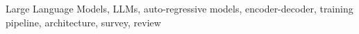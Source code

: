 Large Language Models, LLMs, auto-regressive models, encoder-decoder, training pipeline, architecture, survey, review